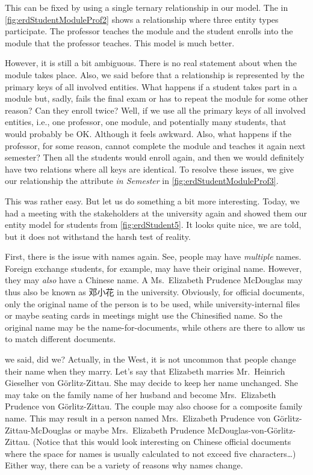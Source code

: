 This can be fixed by using a single ternary relationship in our model.
The  in \cref{fig:erdStudentModuleProf2} shows a relationship where three entity types participate.
The professor teaches the module and the student enrolls into the module that the professor teaches.
This model is much better.

However, it is still a bit ambiguous.
There is no real statement about when the module takes place.
Also, we said before that a relationship is represented by the primary keys of all involved entities.
What happens if a student takes part in a module but, sadly, fails the final exam or has to repeat the module for some other reason?
Can they enroll twice?
Well, if we use all the primary keys of all involved entities, i.e., one professor, one module, and potentially many students, that would probably be OK.
Although it feels awkward.
Also, what happens if the professor, for some reason, cannot complete the module and teaches it again next semester?
Then all the students would enroll again, and then we would definitely have two relations where all keys are identical.
To resolve these issues, we give our relationship the attribute \emph{in Semester} in \cref{fig:erdStudentModuleProf3}.

This was rather easy.
But let us do something a bit more interesting.
Today, we had a meeting with the stakeholders at the university again and showed them our entity model for students from \cref{fig:erdStudent5}.
It looks quite nice, we are told, but it does not withstand the harsh test of reality.

First, there is the issue with names again.
See, people may have \emph{multiple} names.
Foreign exchange students, for example, may have their original name.
However, they may \emph{also} have a Chinese name.
A Ms.~Elizabeth Prudence McDouglas may thus also be known as 邓小花 in the university.
Obviously, for official documents, only the original name of the person is to be used, while university-internal files or maybe seating cards in meetings might use the Chinesified name.
So the original name may be the name-for-documents, while others are there to allow us to match different documents.

 we said, did we?
Actually, in the West, it is not uncommon that people change their name when they marry.
Let's say that Elizabeth marries Mr.~Heinrich Gieselher von G{\"o}rlitz-Zittau.
She may decide to keep her name unchanged.
She may take on the family name of her husband and become Mrs.~Elizabeth Prudence von G{\"o}rlitz-Zittau.
The couple may also choose for a composite family name.
This may result in a person named Mrs.~Elizabeth Prudence von G{\"o}rlitz-Zittau-McDouglas or maybe Mrs.~Elizabeth Prudence McDouglas-von-G{\"o}rlitz-Zittau.
(Notice that this would look interesting on Chinese official documents where the space for names is usually calculated to not exceed five characters\dots)
Either way, there can be a variety of reasons why names change.

